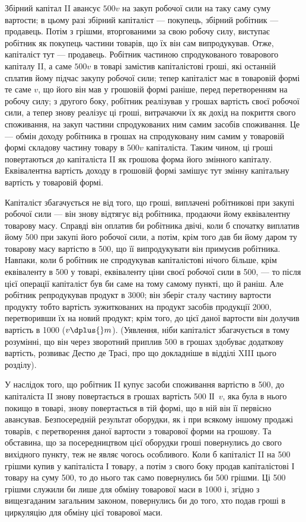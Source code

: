 
Збірний капітал II авансує $500v$ на закуп робочої сили на таку саму
суму вартости; в цьому разі збірний капіталіст — покупець, збірний
робітник — продавець. Потім з грішми, вторгованими за свою робочу силу,
виступає робітник як покупець частини товарів, що їх він сам випродукував.
Отже, капіталіст тут — продавець. Робітник частиною спродукованого
товарового капіталу II, а саме $500v$ в товарі замістив капіталістові
гроші, які останній сплатив йому підчас закупу робочої сили; тепер
капіталіст має в товаровій формі те саме $v$, що його він мав у грошовій
формі раніше, перед перетворенням на робочу силу; з другого боку,
робітник реалізував у грошах вартість своєї робочої сили, а тепер знову
реалізує ці гроші, витрачаючи їх як дохід на покриття свого споживання,
на закуп частини спродукованих ним самим засобів споживання. Це —
обмін доходу робітника в грошах на спродуковану ним самим у товаровій
формі складову частину товару в $500v$ капіталіста. Таким чином,
ці гроші повертаються до капіталіста II як грошова форма його змінного
капіталу. Еквівалентна вартість доходу в грошовій формі замішує тут
змінну капітальну вартість у товаровій формі.

Капіталіст збагачується не від того, що гроші, виплачені робітникові
при закупі робочої сили — він знову відтягує від робітника, продаючи йому
еквівалентну товарову масу. Справді він оплатив би робітника двічі, коли
б спочатку виплатив йому 500 при закупі його робочої сили, а потім,
крім того дав би йому даром ту товарову масу вартістю в 500, що її
випродукувати він примусив робітника. Навпаки, коли б робітник не
спродукував капіталістові нічого більше, крім еквіваленту в 500 у товарі,
еквіваленту ціни своєї робочої сили в 500, — то після цієї операції капіталіст
був би саме на тому самому пункті, що й раніш. Але робітник
репродукував продукт в 3000; він зберіг сталу частину вартости
продукту тобто вартість зужиткованих на продукт засобів продукції \deq{} 2000,
перетворивши їх на новий продукт; крім того, до цієї даної
вартости він долучив вартість в 1000 ($v \dplus{} m$). (Уявлення, ніби капіталіст
збагачується в тому розумінні, що він через зворотний приплив
500 в грошах здобуває додаткову вартість, розвиває Дестю де Трасі, про
що докладніше в відділі XIII цього розділу).

У наслідок того, що робітник II купує засоби споживання вартістю
в 500, до капіталіста II знову повертається в грошах вартість 500 ІІ~$v$,
яка була в нього покищо в товарі, знову повертається в тій формі, що
в ній він її первісно авансував. Безпосередній результат оборудки, як і
при всякому іншому продажі товарів, є перетворення даної вартости з
товарової форми на грошову. Та обставина, що за посередництвом цієї
оборудки гроші повернулись до свого вихідного пункту, теж не являє
чогось особливого. Коли б капіталіст II на 500 грішми купив у капіталіста
І товару, а потім з свого боку продав капіталістові І товару на
суму 500, то до нього так само повернулись би 500 грішми. Ці 500 грішми
служили би лише для обміну товарової маси в 1000 і, згідно з вищезгаданим
загальним законом, повернулись би до того, хто подав гроші в
циркуляцію для обміну цієї товарової маси.
